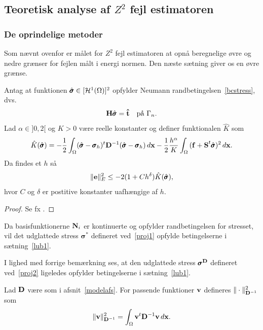 \subsection{Teoretisk analyse af $Z^2$ fejl estimatoren}
\subsubsection{De oprindelige metoder}
Som nævnt ovenfor er målet for $Z^2$ fejl estimatoren at opnå
beregnelige øvre og nedre grænser for fejlen målt i energi normen. Den
næste sætning giver os en øvre grænse.
\begin{theorem} \label{lub1}
Antag at funktionen $\hat{{\pmb\sigma}} \in [\mathcal H^1(\Omega)]^2$ opfylder Neumann
rand\-be\-tin\-gel\-sen~\eqref{bcstress}, dvs.
\begin{equation}
  {\bf H}\hat{\pmb{\sigma}} = {\bf \hat{t}} \quad \text{på $\Gamma_n$}.
\end{equation}
Lad $\alpha\in ]0,2[$ og $K>0$ være reelle konstanter og definer
funktionalen $\hat{K}$ som
\begin{equation}
  \hat{K}(\hat{\pmb{\sigma}}) = -\frac{1}{2} \int_{\Omega}
  (\hat{\pmb{\sigma}} -\pmb{\sigma}_h)^t {\bf D}^{-1} 
  (\hat{\pmb{\sigma}} -\pmb{\sigma}_h) \, d{\bf x} - 
  \frac{1}{2} \frac{h^\alpha}{K} \int_{\Omega} {\bf (f+S}^t 
  \hat{\pmb{\sigma}})^2\, d{\bf x}.
\end{equation}
Da findes et $h$ så
\begin{equation}
  \| {\bf e} \|_E^2 \leq -2(1+Ch^\delta ) \hat{K}(\hat{\pmb{\sigma}}),
\end{equation}
hvor $C$ og $\delta$ er postitive konstanter uafhængige af $h$. 
\end{theorem}
\begin{proof}
Se fx \cite{zz2}. 
\end{proof}
\begin{remark}
Da basisfunktionerne ${\bf N}_i$ er kontinuerte og opfylder
rand\-be\-tin\-gel\-sen for stresset, vil det udglattede stress
$\pmb{\sigma}^{\ast}$ defineret ved~\eqref{proj1} opfylde
be\-tin\-gel\-ser\-ne i sætning~\ref{lub1}. 
\end{remark}
\begin{remark}
I lighed med forrige bemærkning ses, at den udglattede stress
$\pmb{\sigma}^{{\bf D}}$ defineret ved~\eqref{proj2} ligeledes
opfylder betingelserne i sætning~\ref{lub1}. 
\end{remark}
\begin{definition}
Lad $\bf D$ være som i afsnit~\ref{modelafs}. For passende funktioner
${\bf v}$ defineres $\|\cdot\|_{{\bf D}^{-1}}^2$ som 
\begin{equation}
  \|{\bf v}\|_{{\bf D}^{-1}}^2 = \int_{\Omega} {\bf v}^t{\bf D}^{-1}{\bf v}\, d{\bf x}. 
\end{equation}
\end{definition}
